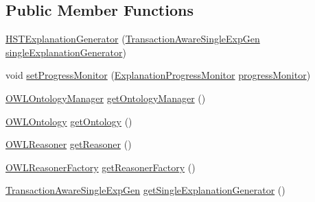 \subsection*{Public Member Functions}
\begin{DoxyCompactItemize}
\item 
\hyperlink{classcom_1_1clarkparsia_1_1owlapi_1_1explanation_1_1_h_s_t_explanation_generator_a4169e83e93765377fd85675faf87003d}{H\-S\-T\-Explanation\-Generator} (\hyperlink{interfacecom_1_1clarkparsia_1_1owlapi_1_1explanation_1_1_transaction_aware_single_exp_gen}{Transaction\-Aware\-Single\-Exp\-Gen} \hyperlink{classcom_1_1clarkparsia_1_1owlapi_1_1explanation_1_1_h_s_t_explanation_generator_a85e3661c6342eb22238b33589cbc1abb}{single\-Explanation\-Generator})
\item 
void \hyperlink{classcom_1_1clarkparsia_1_1owlapi_1_1explanation_1_1_h_s_t_explanation_generator_aa9b76b563ccdb6d1b239a4ae676e3b05}{set\-Progress\-Monitor} (\hyperlink{interfacecom_1_1clarkparsia_1_1owlapi_1_1explanation_1_1util_1_1_explanation_progress_monitor}{Explanation\-Progress\-Monitor} \hyperlink{classcom_1_1clarkparsia_1_1owlapi_1_1explanation_1_1_h_s_t_explanation_generator_a7bdbc0d09a1d9d0067b51c99cd479d82}{progress\-Monitor})
\item 
\hyperlink{interfaceorg_1_1semanticweb_1_1owlapi_1_1model_1_1_o_w_l_ontology_manager}{O\-W\-L\-Ontology\-Manager} \hyperlink{classcom_1_1clarkparsia_1_1owlapi_1_1explanation_1_1_h_s_t_explanation_generator_ab84e904a9a87868d3e761e0cee8429c6}{get\-Ontology\-Manager} ()
\item 
\hyperlink{interfaceorg_1_1semanticweb_1_1owlapi_1_1model_1_1_o_w_l_ontology}{O\-W\-L\-Ontology} \hyperlink{classcom_1_1clarkparsia_1_1owlapi_1_1explanation_1_1_h_s_t_explanation_generator_a30856bbde825071eefd3da4b8c90f54a}{get\-Ontology} ()
\item 
\hyperlink{interfaceorg_1_1semanticweb_1_1owlapi_1_1reasoner_1_1_o_w_l_reasoner}{O\-W\-L\-Reasoner} \hyperlink{classcom_1_1clarkparsia_1_1owlapi_1_1explanation_1_1_h_s_t_explanation_generator_ad6a3cfea526d13e606a01593a75a7571}{get\-Reasoner} ()
\item 
\hyperlink{interfaceorg_1_1semanticweb_1_1owlapi_1_1reasoner_1_1_o_w_l_reasoner_factory}{O\-W\-L\-Reasoner\-Factory} \hyperlink{classcom_1_1clarkparsia_1_1owlapi_1_1explanation_1_1_h_s_t_explanation_generator_a8eb59697e652c8b50080377837447ec7}{get\-Reasoner\-Factory} ()
\item 
\hyperlink{interfacecom_1_1clarkparsia_1_1owlapi_1_1explanation_1_1_transaction_aware_single_exp_gen}{Transaction\-Aware\-Single\-Exp\-Gen} \hyperlink{classcom_1_1clarkparsia_1_1owlapi_1_1explanation_1_1_h_s_t_explanation_generator_a78947ddcc6ecf65f821817fef3ac0782}{get\-Single\-Explanation\-Generator} ()

\end{DoxyCompactItemize}
